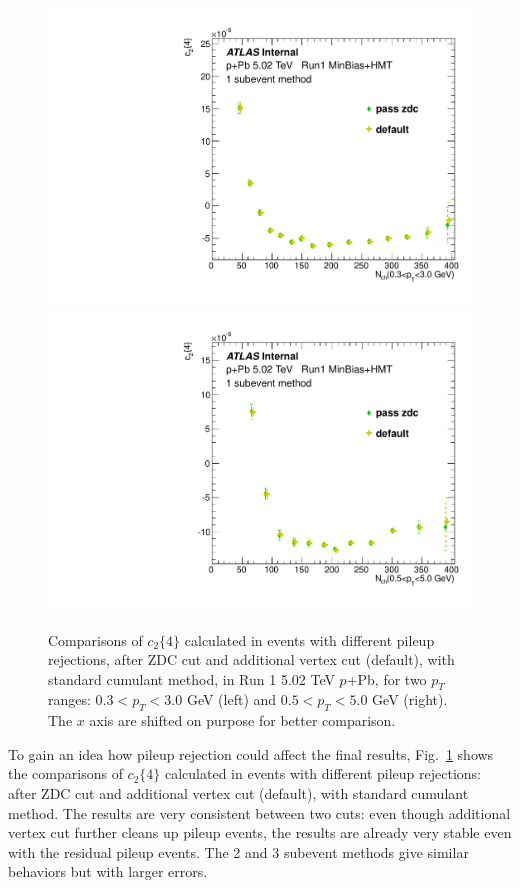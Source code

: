 \begin{figure}[H]
\centering
\includegraphics[width=0.45\linewidth]{figs/sec_sys/pPb5/PU_c4_1sub_Pt0.pdf}
\includegraphics[width=0.45\linewidth]{figs/sec_sys/pPb5/PU_c4_1sub_Pt1.pdf}
\caption{Comparisons of $c_{2}\{4\}$ calculated in events with different pileup rejections, after ZDC cut and additional vertex cut (default), with standard cumulant method, in Run 1 5.02 TeV $p$+Pb, for two $p_{T}$ ranges: $0.3<p_{T}<3.0$ GeV (left) and $0.5<p_{T}<5.0$ GeV (right). The $x$ axis are shifted on purpose for better comparison.}
\label{fig:chk_PU_c24}
\end{figure}
To gain an idea how pileup rejection could affect the final results, Fig.~\ref{fig:chk_PU_c24} shows the comparisons of $c_{2}\{4\}$ calculated in events with different pileup rejections: after ZDC cut and additional vertex cut (default), with standard cumulant method. The results are very consistent between two cuts: even though additional vertex cut further cleans up pileup events, the results are already very stable even with the residual pileup events. The 2 and 3 subevent methods give similar behaviors but with larger errors.



